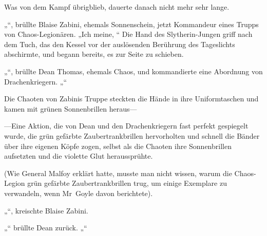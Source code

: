 Was von dem Kampf übrigblieb, dauerte danach nicht mehr sehr lange.

\later

„“, brüllte Blaise Zabini, ehemals Sonnenschein, jetzt Kommandeur eines Trupps von Chaos-Legionären. „Ich meine, “ Die Hand des Slytherin-Jungen griff nach dem Tuch, das den Kessel vor der auslösenden Berührung des Tageslichts abschirmte, und begann bereits, es zur Seite zu schieben.

„“, brüllte Dean Thomas, ehemals Chaos, und kommandierte eine Abordnung von Drachenkriegern. „“

Die Chaoten von Zabinis Truppe steckten die Hände in ihre Uniformtaschen und kamen mit grünen Sonnenbrillen heraus—

—Eine Aktion, die von Dean und den Drachenkriegern fast perfekt gespiegelt wurde, die grün gefärbte Zaubertrankbrillen hervorholten und schnell die Bänder über ihre eigenen Köpfe zogen, selbst als die Chaoten ihre Sonnenbrillen aufsetzten und die violette Glut heraussprühte.

(Wie General Malfoy erklärt hatte, musste man nicht wissen, warum die Chaos-Legion grün gefärbte Zaubertrankbrillen trug, um einige Exemplare zu verwandeln, wenn Mr~Goyle davon berichtete).

„“, kreischte Blaise Zabini.

„“ brüllte Dean zurück. „“


